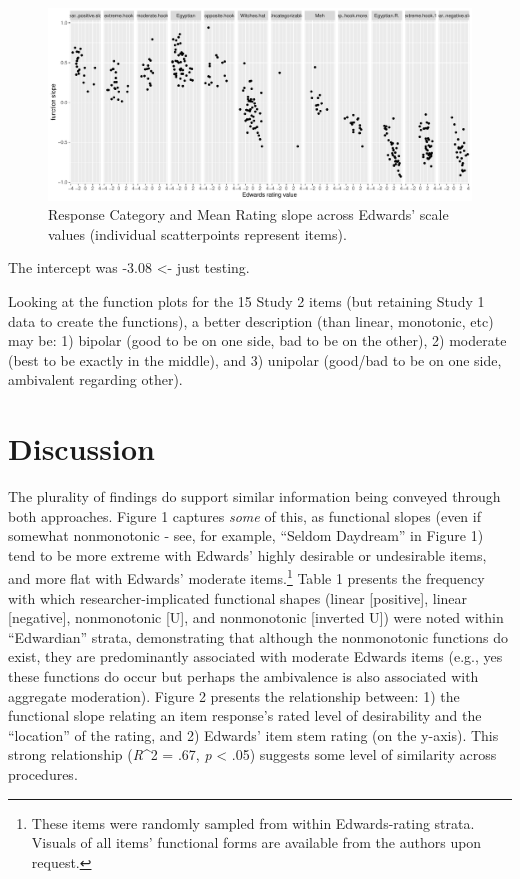 \documentclass[
  ,jou]{apa6}
\begin{document}
\begin{figure}
\centering
\includegraphics{KuncelTellegen_files/figure-latex/lastone-1.pdf}
\caption{\label{fig:lastone}Response Category and Mean Rating slope across Edwards' scale values (individual scatterpoints represent items).}
\end{figure}

The intercept was -3.08 \textless- just testing.

Looking at the function plots for the 15 Study 2 items (but retaining Study 1 data to create the functions), a better description (than linear, monotonic, etc) may be: 1) bipolar (good to be on one side, bad to be on the other), 2) moderate (best to be exactly in the middle), and 3) unipolar (good/bad to be on one side, ambivalent regarding other).

\hypertarget{discussion}{%
\section{Discussion}\label{discussion}}

The plurality of findings do support similar information being conveyed through both approaches. Figure 1 captures \emph{some} of this, as functional slopes (even if somewhat nonmonotonic - see, for example, ``Seldom Daydream'' in Figure 1) tend to be more extreme with Edwards' highly desirable or undesirable items, and more flat with Edwards' moderate items.\footnote{These items were randomly sampled from within Edwards-rating strata. Visuals of all items' functional forms are available from the authors upon request.} Table 1 presents the frequency with which researcher-implicated functional shapes (linear {[}positive{]}, linear {[}negative{]}, nonmonotonic {[}U{]}, and nonmonotonic {[}inverted U{]}) were noted within ``Edwardian'' strata, demonstrating that although the nonmonotonic functions do exist, they are predominantly associated with moderate Edwards items (e.g., yes these functions do occur but perhaps the ambivalence is also associated with aggregate moderation). Figure 2 presents the relationship between: 1) the functional slope relating an item response's rated level of desirability and the ``location'' of the rating, and 2) Edwards' item stem rating (on the y-axis). This strong relationship (\emph{R}\^{}2 = .67, \emph{p} \textless{} .05) suggests some level of similarity across procedures.
\end{document}
